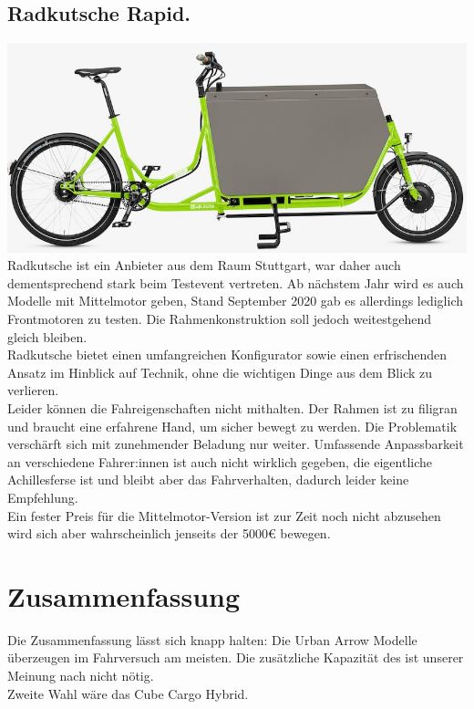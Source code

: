 \documentclass[a4paper,ngerman, 14pt] {scrartcl}
\begin{document}
\subsection{Radkutsche Rapid.}
\includegraphics[scale=0.64]{radkutsche_rapid.png}\\
Radkutsche ist ein Anbieter aus dem Raum Stuttgart, war daher auch dementsprechend stark beim Testevent vertreten. Ab nächstem Jahr wird es auch Modelle mit Mittelmotor geben, Stand September 2020 gab es allerdings lediglich Frontmotoren zu testen. Die Rahmenkonstruktion soll jedoch weitestgehend gleich bleiben.\\
Radkutsche bietet einen umfangreichen Konfigurator sowie einen erfrischenden  Ansatz im Hinblick auf Technik, ohne die wichtigen Dinge aus dem Blick zu verlieren.\\
Leider können die Fahreigenschaften nicht mithalten. Der Rahmen ist zu filigran und braucht eine erfahrene Hand, um sicher bewegt zu werden. Die Problematik verschärft sich mit zunehmender Beladung nur weiter. Umfassende Anpassbarkeit an verschiedene Fahrer:innen ist auch nicht wirklich gegeben, die eigentliche Achillesferse ist und bleibt aber das Fahrverhalten, dadurch leider keine Empfehlung.\\
Ein fester Preis für die Mittelmotor-Version ist zur Zeit noch nicht abzusehen wird sich aber wahrscheinlich jenseits der 5000€ bewegen.
\newpage


\section{Zusammenfassung}
Die Zusammenfassung lässt sich knapp halten: Die Urban Arrow Modelle überzeugen im Fahrversuch am meisten. Die zusätzliche Kapazität des  ist unserer Meinung nach nicht nötig.\\
Zweite Wahl wäre das Cube Cargo Hybrid.
\end{document}
